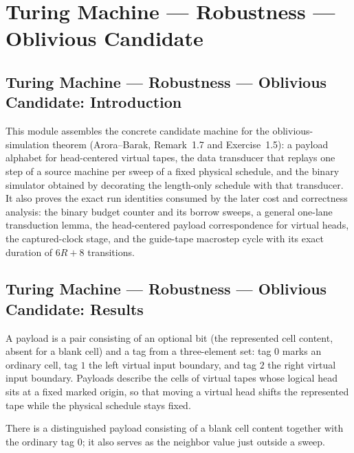 \section{Turing Machine --- Robustness --- Oblivious Candidate}
\subsection*{Turing Machine --- Robustness --- Oblivious Candidate: Introduction}

This module assembles the concrete candidate machine for the oblivious-simulation
theorem (Arora--Barak, Remark~1.7 and Exercise~1.5): a payload alphabet for
head-centered virtual tapes, the data transducer that replays one step of a source
machine per sweep of a fixed physical schedule, and the binary simulator obtained by
decorating the length-only schedule with that transducer.  It also proves the exact
run identities consumed by the later cost and correctness analysis: the binary budget
counter and its borrow sweeps, a general one-lane transduction lemma, the
head-centered payload correspondence for virtual heads, the captured-clock stage, and
the guide-tape macrostep cycle with its exact duration of $6R+8$ transitions.

\subsection*{Turing Machine --- Robustness --- Oblivious Candidate: Results}

\begin{definition}
\label{Complexity.OblPayload}
\leanok
A payload is a pair consisting of an optional bit (the represented cell content,
absent for a blank cell) and a tag from a three-element set: tag $0$ marks an
ordinary cell, tag $1$ the left virtual input boundary, and tag $2$ the right
virtual input boundary.  Payloads describe the cells of virtual tapes whose
logical head sits at a fixed marked origin, so that moving a virtual head shifts
the represented tape while the physical schedule stays fixed.
\end{definition}

\begin{definition}
\label{Complexity.blankPayload}
\leanok
{}
There is a distinguished payload consisting of a blank cell content together with the
ordinary tag $0$; it also serves as the neighbor value just outside a sweep.
\end{definition}

